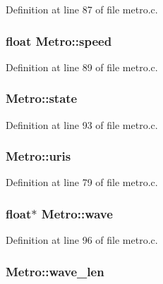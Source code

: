 Definition at line 87 of file metro.\+c.

\subsubsection[{\texorpdfstring{speed}{speed}}]{\setlength{\rightskip}{0pt plus 5cm}float Metro\+::speed}\hypertarget{struct_metro_a761e25a27910e7725b3ff3015387251f}{}\label{struct_metro_a761e25a27910e7725b3ff3015387251f}


Definition at line 89 of file metro.\+c.

\subsubsection[{\texorpdfstring{state}{state}}]{ Metro\+::state}\hypertarget{struct_metro_aa21e79985e7fe176b8fcbbfe4f3102bf}{}\label{struct_metro_aa21e79985e7fe176b8fcbbfe4f3102bf}


Definition at line 93 of file metro.\+c.

\subsubsection[{\texorpdfstring{uris}{uris}}]{ Metro\+::uris}\hypertarget{struct_metro_ad4d1aee5161d6e66279edc5b05012087}{}\label{struct_metro_ad4d1aee5161d6e66279edc5b05012087}


Definition at line 79 of file metro.\+c.

\subsubsection[{\texorpdfstring{wave}{wave}}]{\setlength{\rightskip}{0pt plus 5cm}float$\ast$ Metro\+::wave}\hypertarget{struct_metro_a42515e404bb842cfb7c3e533e5ff380a}{}\label{struct_metro_a42515e404bb842cfb7c3e533e5ff380a}


Definition at line 96 of file metro.\+c.

\subsubsection[{\texorpdfstring{wave\+\_\+len}{wave_len}}]{ Metro\+::wave\+\_\+len}\hypertarget{struct_metro_af1d13cb6f02c620ee7e9647ac78bc04a}{}\label{struct_metro_af1d13cb6f02c620ee7e9647ac78bc04a}


